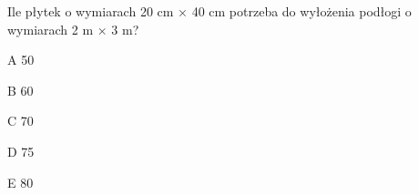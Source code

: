 \begin{tresc}
Ile płytek o wymiarach 20 cm × 40 cm potrzeba do wyłożenia podłogi o wymiarach 2 m × 3 m?
\end{tresc}
\begin{wariant}{A} 50 \end{wariant}
\begin{wariant}{B} 60 \end{wariant}
\begin{wariant}{C} 70 \end{wariant}
\begin{wariant}{D} 75 \end{wariant}
\begin{wariant}{E} 80 \end{wariant}
